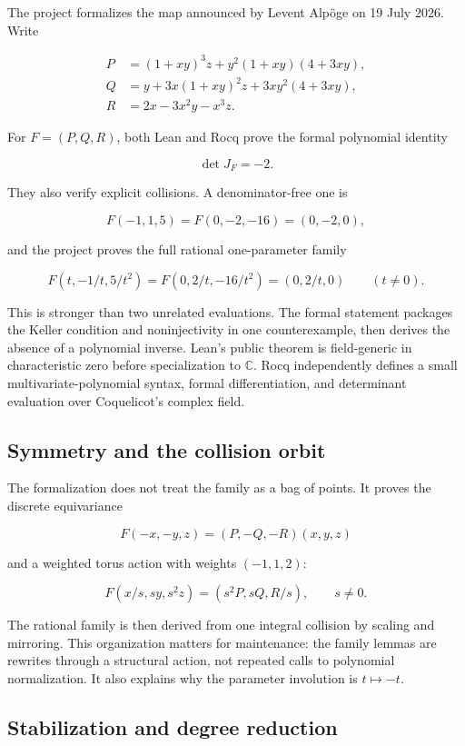 \documentclass[
  10pt,
  a4paper,
  twoside,
  open=any,
  parskip=half,
  headings=big
]{scrreprt}
\begin{document}
The project formalizes the map announced by Levent Alp\"oge on 19 July 2026. Write

\[
\begin{aligned}
P &= (1+xy)^3z+y^2(1+xy)(4+3xy),\\
Q &= y+3x(1+xy)^2z+3xy^2(4+3xy),\\
R &= 2x-3x^2y-x^3z.
\end{aligned}
\]

For \(F=(P,Q,R)\), both Lean and Rocq prove the formal polynomial identity

\[
\det J_F=-2.
\]

They also verify explicit collisions. A denominator-free one is

\[
F(-1,1,5)=F(0,-2,-16)=(0,-2,0),
\]

and the project proves the full rational one-parameter family

\[
F(t,-1/t,5/t^2)=F(0,2/t,-16/t^2)=(0,2/t,0)
\qquad (t\ne 0).
\]

This is stronger than two unrelated evaluations. The formal statement packages the Keller condition and noninjectivity in one counterexample, then derives the absence of a polynomial inverse. Lean's public theorem is field-generic in characteristic zero before specialization to \(\mathbb C\). Rocq independently defines a small multivariate-polynomial syntax, formal differentiation, and determinant evaluation over Coquelicot's complex field.

\subsection{Symmetry and the collision orbit}

The formalization does not treat the family as a bag of points. It proves the discrete equivariance

\[
F(-x,-y,z)=(P,-Q,-R)(x,y,z)
\]

and a weighted torus action with weights \((-1,1,2)\):

\[
F(x/s,sy,s^2z)=(s^2P,sQ,R/s), \qquad s\ne0.
\]

The rational family is then derived from one integral collision by scaling and mirroring. This organization matters for maintenance: the family lemmas are rewrites through a structural action, not repeated calls to polynomial normalization. It also explains why the parameter involution is \(t\mapsto -t\).

\subsection{Stabilization and degree reduction}
\end{document}

